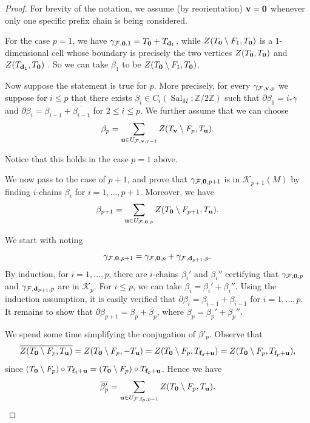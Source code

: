 \documentclass[10pt,a4paper]{amsart}
\newcommand\Fcal{{\mathcal F}}
\newcommand\Kcal{{\mathcal K}}
\DeclareMathOperator{\Sal}{Sal}
\newcommand\Ztwo{{\mathbb Z}/2{\mathbb Z}}
\newcommand\dd{{\bf d}}
\newcommand\ff{{\bf f}}
\newcommand\vv{{\bf v}}
\begin{document}
\begin{proof}
For brevity of the notation, we assume (by reorientation) $\vv={\bf 0}$ whenever only one specific prefix chain is being considered.

For the case $p=1$, we have $\gamma_{\Fcal, {\bf 0},1}=T_{{\bf 0}}+T_{\dd_1}$, while $Z(T_{\bf 0}\setminus F_1,T_{\bf 0})$ is a $1$-dimensional cell whose boundary is precisely the two vertices $Z(T_{\bf 0},T_{\bf 0})$ and 
$Z(T_{\dd_1},T_{\bf 0})$ .
So we can take $\beta_1$ to be $Z(T_{\bf 0}\setminus F_1,T_{\bf 0})$.

Now suppose the statement is true for $p$. More precisely, for every $\gamma_{\Fcal,\vv,p}$ we suppose for $i \leq p$ that 
there exists $ \beta_i \in C_i(\Sal_M; \Ztwo)$ such that 
$\partial\beta_1= i_{\ast} \gamma$ and $\partial\beta_i=\beta_{i-1}+\overline{\beta_{i-1}}$ for $ 2 \leq i \leq p$. 
We further assume that we can choose 
\begin{equation}\label{eq:beta_p}
    \beta_{p}  = \sum_{{\bf u}\in U_{\Fcal,\vv,p-1}} Z(T_{\vv}\setminus F_{p},T_{\bf u}).
\end{equation}

Notice that this holds in the case $p = 1$ above.

We now pass to the case of $p+1$, and prove that $\gamma_{\Fcal,{\bf 0},p+1}$
is in $\Kcal_{p+1}(M)$ by finding $i$-chains $\beta_i$ for $i = 1, \dots, p+1$. Moreover, we have 
$$\beta_{p+1} = \sum_{{\bf u}\in U_{\Fcal, {\bf 0}, p}} Z(T_{\bf 0}\setminus F_{p+1},T_{\bf u}).$$
 
We start with noting $$\gamma_{\Fcal, {\bf 0},p+1}=\gamma_{\Fcal, {\bf 0},p}+\gamma_{\Fcal, \dd_{p+1},p}.$$ 
By induction, for $i = 1, \ldots, p$, 
there are $i$-chains $\beta_i'$ and $\beta_i''$ certifying that $\gamma_{\Fcal, {\bf 0},p}$ and $\gamma_{\Fcal, \dd_{p+1},p} $ are in $\Kcal_p$.
For $i \leq p$, we can take $\beta_i = \beta_i' + \beta_i''$. Using the induction assumption, it is easily verified that $\partial \beta_i = \beta_{i-1} +\overline{\beta_{i-1}}$ for $i = 1, \ldots, p$. 
It remains to show that $\partial \beta_{p+1} = \beta_p + \overline{\beta_{p}}$, where $\beta_p = \beta_p' + \beta_p''$.

We spend some time simplifying the conjugation of $\beta'_p$. 
Observe that
$$\overline{Z(T_{\bf 0}\setminus F_p,T_{\bf u})}
=Z(T_{\bf 0}\setminus F_p,-T_{\bf u})
=Z(T_{\bf 0}\setminus F_p,T_{\ff_d + \bf u})
=Z(T_{\bf 0}\setminus F_p,T_{\ff_p+ {\bf u}}),$$ 
since $(T_{\bf 0}\setminus F_p) \circ T_{\ff_d + \bf u} = (T_{\bf 0}\setminus F_p) \circ T_{\ff_p+ {\bf u}}$.
Hence we have
 $$\overline{\beta'_p} = \sum_{{\bf u}\in U_{\Fcal,\ff_p,p-1}} Z(T_{\bf 0}\setminus F_p,T_{\bf u}).$$


\end{proof}
\end{document}
